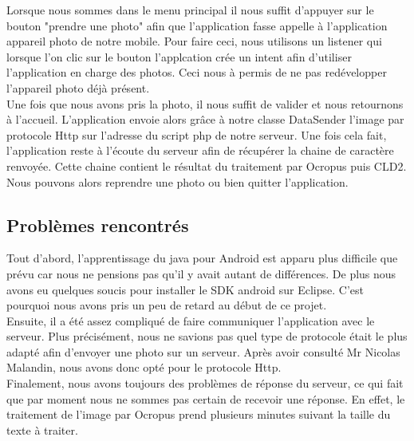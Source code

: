 Lorsque nous sommes dans le menu principal il nous suffit d'appuyer sur le bouton "prendre une photo" afin que l'application fasse appelle à l'application appareil photo de notre mobile. Pour faire ceci, nous utilisons un listener qui lorsque l'on clic sur le bouton l'applcation crée un intent afin d'utiliser l'application en charge des photos. Ceci nous à permis de ne pas redévelopper l'appareil photo déjà présent.\\

Une fois que nous avons pris la photo, il nous suffit de valider et nous retournons à l'accueil. L'application envoie alors grâce à notre classe DataSender l'image par protocole Http sur l'adresse du script php de notre serveur. Une fois cela fait, l'application reste à l'écoute du serveur afin de récupérer la chaine de caractère renvoyée. Cette chaine contient le résultat du traitement par Ocropus puis CLD2.\\

Nous pouvons alors reprendre une photo ou bien quitter l'application.

\subsection{Problèmes rencontrés}

Tout d'abord, l'apprentissage du java pour Android est apparu plus difficile que prévu car nous ne pensions pas qu'il y avait autant de différences. De plus nous avons eu quelques soucis pour installer le SDK android sur Eclipse. C'est pourquoi nous avons pris un peu de retard au début de ce projet.\\

Ensuite, il a été assez compliqué de faire communiquer l'application avec le serveur. Plus précisément, nous ne savions pas quel type de protocole était le plus adapté afin d'envoyer une photo sur un serveur. Après avoir consulté Mr Nicolas Malandin, nous avons donc opté pour le protocole Http.\\

Finalement, nous avons toujours des problèmes de réponse du serveur, ce qui fait que par moment nous ne sommes pas certain de recevoir une réponse. En effet, le traitement de l'image par Ocropus prend plusieurs minutes suivant la taille du texte à traiter.